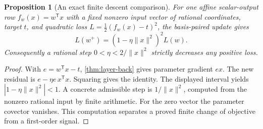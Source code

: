 \documentclass[11pt,a4paper]{article}
\newtheorem{proposition}[proposition]{Proposition}
\theoremstyle{definition}
\theoremstyle{remark}\newaliascnt{remark}{theorem}
\numberwithin{equation}{section}
\begin{document}
\begin{proposition}[An exact finite descent comparison]
For one affine scalar-output row \(f_w(x)=w^{\mathsf{T}} x\) with a fixed nonzero input vector of rational coordinates, target \(t\), and quadratic loss \(L=\tfrac12(f_w(x)-t)^2\), the basis-paired update gives
\[
 L(w^+)=(1-\eta\|x\|^2)^2 L(w).
\]
Consequently a rational step \(0<\eta<2/\|x\|^2\) strictly decreases any positive loss.
\end{proposition}
\begin{proof}
With \(e=w^{\mathsf{T}} x-t\), \cref{thm:layer-back} gives parameter gradient \(ex\). The new residual is \(e-\eta e\,x^{\mathsf{T}} x\). Squaring gives the identity. The displayed interval yields \(|1-\eta\|x\|^2|<1\). A concrete admissible step is \(1/\|x\|^2\), computed from the nonzero rational input by finite arithmetic. For the zero vector the parameter covector vanishes. This computation separates a proved finite change of objective from a first-order signal.
\end{proof}
\end{document}
